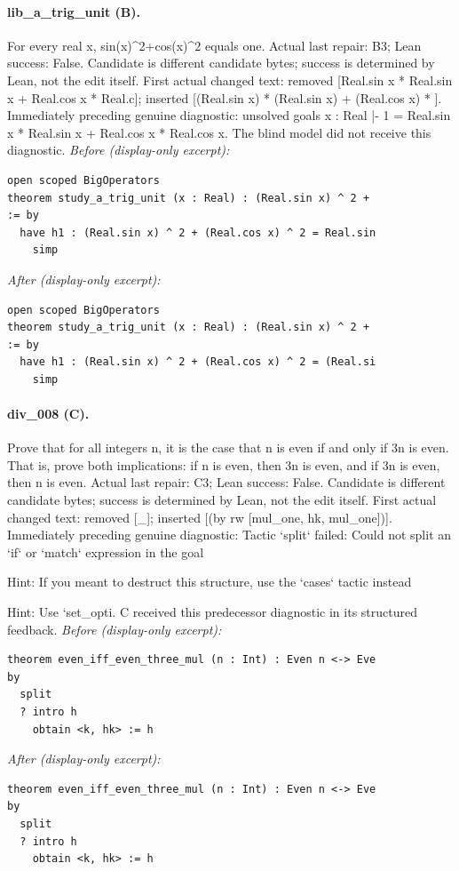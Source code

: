 \paragraph{lib\_a\_trig\_unit (B).}
For every real x, sin(x)\textasciicircum{}2+cos(x)\textasciicircum{}2 equals one.
Actual last repair: B3; Lean success: False. Candidate is different candidate bytes; success is determined by Lean, not the edit itself.
First actual changed text: removed [Real.sin x * Real.sin x + Real.cos x * Real.c]; inserted [(Real.sin x) * (Real.sin x) + (Real.cos x) * ].
Immediately preceding genuine diagnostic: unsolved goals
x : Real
|- 1 = Real.sin x * Real.sin x + Real.cos x * Real.cos x.
The blind model did not receive this diagnostic.
\textit{Before (display-only excerpt):}
\begin{verbatim}
open scoped BigOperators
theorem study_a_trig_unit (x : Real) : (Real.sin x) ^ 2 +
:= by
  have h1 : (Real.sin x) ^ 2 + (Real.cos x) ^ 2 = Real.sin
    simp
\end{verbatim}
\textit{After (display-only excerpt):}
\begin{verbatim}
open scoped BigOperators
theorem study_a_trig_unit (x : Real) : (Real.sin x) ^ 2 +
:= by
  have h1 : (Real.sin x) ^ 2 + (Real.cos x) ^ 2 = (Real.si
    simp
\end{verbatim}
\paragraph{div\_008 (C).}
Prove that for all integers n, it is the case that n is even if and only if 3n is even. That is, prove both implications: if n is even, then 3n is even, and if 3n is even, then n is even.
Actual last repair: C3; Lean success: False. Candidate is different candidate bytes; success is determined by Lean, not the edit itself.
First actual changed text: removed [\_]; inserted [(by rw [mul\_one, hk, mul\_one])].
Immediately preceding genuine diagnostic: Tactic `split` failed: Could not split an `if` or `match` expression in the goal

Hint: If you meant to destruct this structure, use the `cases` tactic instead

Hint: Use `set\_opti.
C received this predecessor diagnostic in its structured feedback.
\textit{Before (display-only excerpt):}
\begin{verbatim}
theorem even_iff_even_three_mul (n : Int) : Even n <-> Eve
by
  split
  ? intro h
    obtain <k, hk> := h
\end{verbatim}
\textit{After (display-only excerpt):}
\begin{verbatim}
theorem even_iff_even_three_mul (n : Int) : Even n <-> Eve
by
  split
  ? intro h
    obtain <k, hk> := h
\end{verbatim}
